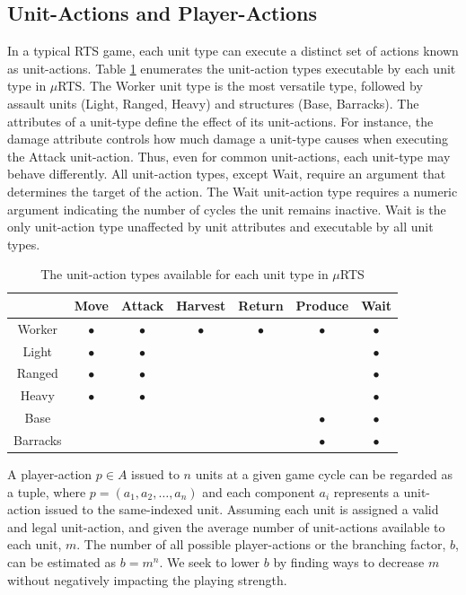 \documentclass[conference]{IEEEtran}
\newcommand{\mRTS}{$\mu$RTS}
\begin{document}
\subsection{Unit-Actions and Player-Actions}

In a typical RTS game, each unit type can execute a distinct set of actions known as unit-actions. Table \ref{unitActionsTable} enumerates the unit-action types executable by each unit type in \mRTS{}. The Worker unit type is the most versatile type, followed by assault units (Light, Ranged, Heavy) and structures (Base, Barracks). The attributes of a unit-type define the effect of its unit-actions. For instance, the damage attribute controls how much damage a unit-type causes when executing the Attack unit-action. Thus, even for common unit-actions, each unit-type may behave differently. All unit-action types, except Wait, require an argument that determines the target of the action. The Wait unit-action type requires a numeric argument indicating the number of cycles the unit remains inactive. Wait is the only unit-action type unaffected by unit attributes and executable by all unit types.

\begin{table}[!t]
\renewcommand{\arraystretch}{1.3}
\caption{The unit-action types available for each unit type in \mRTS{}}
\label{unitActionsTable}
\centering
\begin{tabular}{c|c|c|c|c|c|c}
\cline{2-7}
\multicolumn{1}{c|}{} & Move & Attack & Harvest & Return & Produce & Wait \\
\hline \hline
Worker   & $\bullet$ & $\bullet$ & $\bullet$ & $\bullet$ & $\bullet$ & $\bullet$ \\
Light    & $\bullet$ & $\bullet$ & & & & $\bullet$ \\
Ranged   & $\bullet$ & $\bullet$ & & & & $\bullet$ \\
Heavy    & $\bullet$ & $\bullet$ & & & & $\bullet$ \\
Base     & & & & & $\bullet$ & $\bullet$ \\
Barracks & & & & & $\bullet$ & $\bullet$ \\
\hline
\end{tabular}
\end{table}

A player-action $p \in A$ issued to $n$ units at a given game cycle can be regarded as a tuple, where $p = (a_1, a_2, \dots, a_n)$ and each component $a_i$ represents a unit-action issued to the same-indexed unit. Assuming each unit is assigned a valid and legal unit-action, and given the average number of unit-actions available to each unit, $m$. The number of all possible player-actions or the branching factor, $b$, can be estimated as $b = m^n$. We seek to lower $b$ by finding ways to decrease $m$ without negatively impacting the playing strength.
\end{document}
